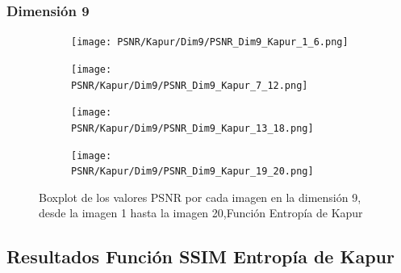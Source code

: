 \documentclass[conference]{IEEEtran}
\begin{document}
\subsubsection{Dimensión 9}
\begin{figure}[htbp]
	\centering
	\begin{subfigure}{0.4\textwidth}
		\texttt{[image: PSNR/Kapur/Dim9/PSNR\_Dim9\_Kapur\_1\_6.png]}
	\end{subfigure}
	
	\begin{subfigure}{0.4\textwidth}
		\texttt{[image: PSNR/Kapur/Dim9/PSNR\_Dim9\_Kapur\_7\_12.png]}
	\end{subfigure}
	\begin{subfigure}{0.4\textwidth}
		\texttt{[image: PSNR/Kapur/Dim9/PSNR\_Dim9\_Kapur\_13\_18.png]}
	\end{subfigure}   
	\begin{subfigure}{0.4\textwidth}
		\texttt{[image: PSNR/Kapur/Dim9/PSNR\_Dim9\_Kapur\_19\_20.png]}
		\vspace{-120pt} %
	\end{subfigure}
	\caption{Boxplot de los valores PSNR por cada imagen en la dimensión 9, desde la imagen 1 hasta la imagen 20,Función Entropía de Kapur}
	\label{fig:imagenes}    
\end{figure}
\subsection{Resultados Función SSIM Entropía de Kapur}
\end{document}
